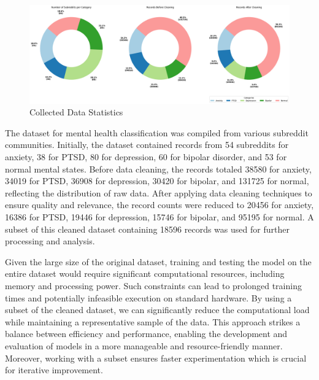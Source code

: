 
\begin{figure}[h!]  
    \centering
    \includegraphics[width=1.0\textwidth]{Images/Data Collection Graph.png}  
    \caption{Collected Data Statistics}
    \label{LSTMROC7uyiut11}  %
\end{figure}

\noindent
The dataset for mental health classification was compiled from various subreddit communities. Initially, the dataset contained records from 54 subreddits for anxiety, 38 for PTSD, 80 for depression, 60 for bipolar disorder, and 53 for normal mental states. Before data cleaning, the records totaled 38580 for anxiety, 34019 for PTSD, 36908 for depression, 30420 for bipolar, and 131725 for normal, reflecting the distribution of raw data. After applying data cleaning techniques to ensure quality and relevance, the record counts were reduced to 20456 for anxiety, 16386 for PTSD, 19446 for depression, 15746 for bipolar, and 95195 for normal. A subset of this cleaned dataset containing 18596 records was used for further processing and analysis.

\vspace{1em}

\noindent
Given the large size of the original dataset, training and testing the model on the entire dataset would require significant computational resources, including memory and processing power. Such constraints can lead to prolonged training times and potentially infeasible execution on standard hardware. By using a subset of the cleaned dataset, we can significantly reduce the computational load while maintaining a representative sample of the data. This approach strikes a balance between efficiency and performance, enabling the development and evaluation of models in a more manageable and resource-friendly manner. Moreover, working with a subset ensures faster experimentation which is crucial for iterative improvement.






